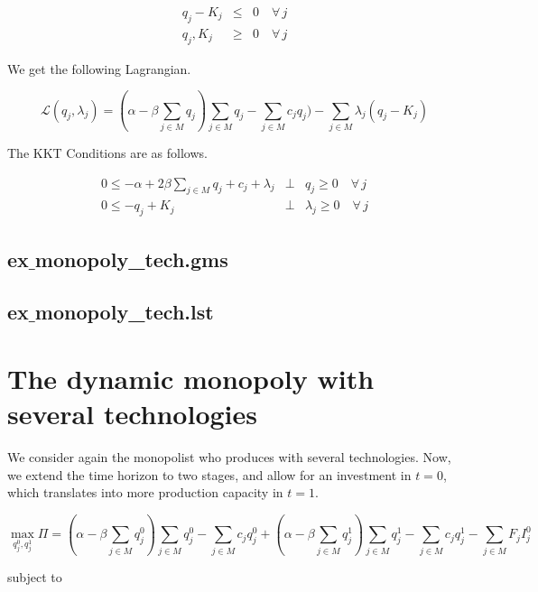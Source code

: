 \documentclass[11pt,a4paper]{article}
\begin{document}
\begin{eqnarray*}
	q_j - K_j &\leq& 0 \quad \forall\,j\\
	q_j, K_j &\geq& 0 \quad \forall\,j
\end{eqnarray*}
 
We get the following Lagrangian.

\begin{equation*}
	\mathcal{L}(q_j,\lambda_j)= (\alpha-\beta \sum_{j\in M}q_j)\sum_{j\in M}q_j - \sum_{j\in M}c_jq_j) - \sum_{j\in M} \lambda_j(q_j-K_j)
\end{equation*}

The KKT Conditions are as follows.

\begin{eqnarray*}
	0 \leq -\alpha + 2\beta \sum_{j\in M}q_j + c_j + \lambda_j &\bot& q_j \geq 0\quad \forall\,j\\
	0 \leq -q_j + K_j &\bot& \lambda_j \geq 0 \quad \forall\,j
\end{eqnarray*}


\subsection*{ex$\_$monopoly\_tech.gms}



\subsection*{ex$\_$monopoly\_tech.lst}



\section{The dynamic monopoly with several technologies}


We consider again the monopolist who produces with several technologies. Now, we extend the time horizon to two stages, and allow for an investment in $t=0$, which translates into more production capacity in $t=1$.

\begin{equation*}
	\max_{q_j^0,q_j^1}\Pi = (\alpha-\beta \sum_{j\in M}q_j^0)\sum_{j\in M}q_j^0 - \sum_{j\in M}c_jq_j^0 +  (\alpha-\beta \sum_{j\in M}q_j^1)\sum_{j\in M}q_j^1 - \sum_{j\in M}c_jq_j^1 - \sum_{j\in M}F_jI_j^0
\end{equation*}

subject to
\end{document}
